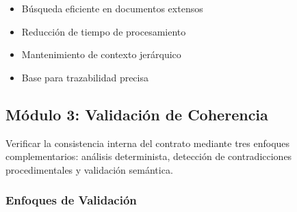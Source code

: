 \documentclass[12pt,a4paper]{article}
\begin{document}
\begin{itemize}[leftmargin=*]
    \item Búsqueda eficiente en documentos extensos
    \item Reducción de tiempo de procesamiento
    \item Mantenimiento de contexto jerárquico
    \item Base para trazabilidad precisa
\end{itemize}

\subsection{Módulo 3: Validación de Coherencia}

\begin{tcolorbox}[colback=mediumblue!20, colframe=mediumblue!80!black, title=Objetivos del Módulo 3]
Verificar la consistencia interna del contrato mediante tres enfoques complementarios: análisis determinista, detección de contradicciones procedimentales y validación semántica.
\end{tcolorbox}

\subsubsection{Enfoques de Validación}
\end{document}
